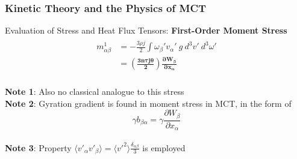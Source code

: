 \documentclass{beamer}
\begin{document}
\begin{frame}
\frametitle{Kinetic Theory and the Physics of MCT}
Evaluation of Stress and Heat Flux Tensors: \textbf{First-Order Moment Stress}
\small
\begin{align*}
\begin{split}
 \label{surfacemoment}
 m^1_{\alpha \beta} &= -\frac{3\rho j}{2} \int 
\omega_{\beta}'v_{\alpha}' \ g \ d^3v' \ d^3 \omega' 
\\ &= 
\bm{(\frac{3n\tau j\theta}{2})\frac{\partial W_{\beta}}{\partial 
x_\alpha}}
\end{split}
\end{align*}
\\
\pause
\textbf{Note 1}: Also no classical analogue to this stress \\
\vspace{5mm}
\pause
\textbf{Note 2}: Gyration gradient is found in moment stress in MCT, in the 
form of $$\gamma b_{\beta \alpha} = \gamma \frac{\partial W_{\beta}}{\partial 
x_{\alpha}}$$\\
\vspace{5mm}
\pause
\textbf{Note 3}: Property $\langle v'_{\alpha} v'_{\beta} \rangle = \langle 
v'^2 \rangle \frac{\delta_{\alpha \beta}}{3}$ is employed
\end{frame}
\end{document}
